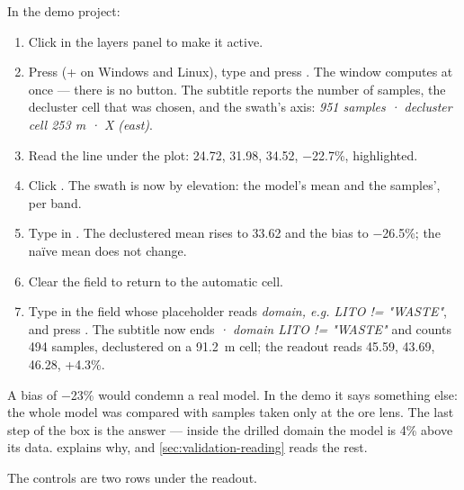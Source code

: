 \begin{tryit}
In the demo project:
\begin{enumerate}
\item Click  in the layers panel to make it active.
\item Press  (+ on Windows and Linux), type  and press . The window computes at once — there is no  button. The subtitle reports the number of samples, the decluster cell that was chosen, and the swath's axis: \emph{951 samples · decluster cell 253 m · X (east)}.
\item Read the line under the plot:  24.72,  31.98,  34.52,  −22.7\%, highlighted.
\item Click . The swath is now by elevation: the model's mean  and the samples', per band.
\item Type  in . The declustered mean rises to 33.62 and the bias to −26.5\%; the naïve mean does not change.
\item Clear the field to return to the automatic cell.
\item Type  in the field whose placeholder reads \emph{domain, e.g. LITO != "WASTE"}, and press . The subtitle now ends \emph{· domain LITO != "WASTE"} and counts 494 samples, declustered on a 91.2~m cell; the readout reads  45.59,  43.69,  46.28,  +4.3\%.
\end{enumerate}
\end{tryit}


A bias of −23\% would condemn a real model. In the demo it says something else: the whole model was compared with samples taken only at the ore lens. The last step of the box is the answer — inside the drilled domain the model is 4\% above its data.  explains why, and \cref{sec:validation-reading} reads the rest.

The controls are two rows under the readout.

